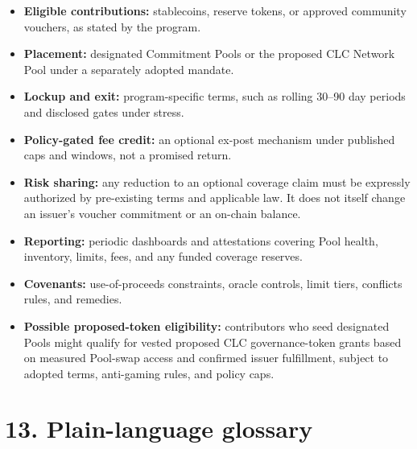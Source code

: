 \documentclass[11pt]{article}
\begin{document}
\begin{itemize}[leftmargin=*]
\item \textbf{Eligible contributions:} stablecoins, reserve tokens, or approved community vouchers, as stated by the program.
\item \textbf{Placement:} designated Commitment Pools or the proposed CLC Network Pool under a separately adopted mandate.
\item \textbf{Lockup and exit:} program-specific terms, such as rolling 30--90 day periods and disclosed gates under stress.
\item \textbf{Policy-gated fee credit:} an optional ex-post mechanism under published caps and windows, not a promised return.
\item \textbf{Risk sharing:} any reduction to an optional coverage claim must be expressly authorized by pre-existing terms and applicable law. It does not itself change an issuer's voucher commitment or an on-chain balance.
\item \textbf{Reporting:} periodic dashboards and attestations covering Pool health, inventory, limits, fees, and any funded coverage reserves.
\item \textbf{Covenants:} use-of-proceeds constraints, oracle controls, limit tiers, conflicts rules, and remedies.
\item \textbf{Possible proposed-token eligibility:} contributors who seed designated Pools might qualify for vested proposed CLC governance-token grants based on measured Pool-swap access and confirmed issuer fulfillment, subject to adopted terms, anti-gaming rules, and policy caps.
\end{itemize}


\section*{13. Plain-language glossary}
\end{document}

